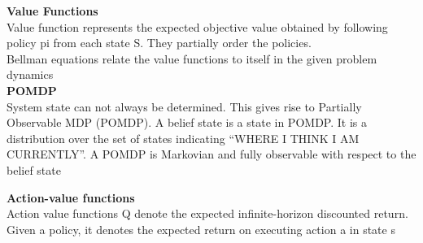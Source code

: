 \textbf{Value Functions} \\
Value function represents the expected objective value obtained by following policy pi from each state S. They partially order the policies.\\
Bellman equations relate the value functions to itself in the given problem dynamics
\\


\textbf{POMDP} \\
System state can not always be determined. This gives rise to Partially Observable MDP (POMDP). A belief state is a state in POMDP. It is a distribution over the set of states indicating “WHERE I THINK I AM CURRENTLY”. A POMDP is Markovian and fully observable with respect to the belief state


\textbf{Action-value functions}\\
Action value functions Q denote the expected infinite-horizon discounted return. Given a policy, it denotes the expected return on executing action a in state s 

